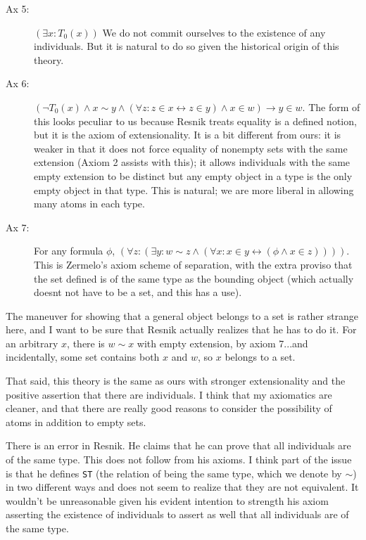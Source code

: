 \documentclass[12pt]{article}
\begin{document}
\begin{description}
\item[Ax 5:]  $(\exists x:T_0(x))$  We do not commit ourselves to the existence of any individuals.  But it is natural to do so given the historical origin of this theory.

\item[Ax 6:]  $(\neg T_0(x) \wedge x \sim y \wedge (\forall z:z \in x \leftrightarrow z \in y) \wedge x \in w) \rightarrow y \in w$.  The form of this looks peculiar to us because Resnik treats equality is a defined notion, but it is the axiom of extensionality.  It is a bit different from ours:  it is weaker in that it does not force equality of nonempty sets with the same extension (Axiom 2 assists with this);  it allows individuals with the same empty extension to be distinct but any empty object in a type is the only empty object in that type.  This is natural;  we are more liberal in allowing many atoms in each type.

\item[Ax 7:] For any formula $\phi$, $(\forall z:(\exists y:w \sim z \wedge (\forall x:x \in y \leftrightarrow (\phi \wedge x \in z))))$.  This is Zermelo's axiom scheme of separation, with the extra proviso that the set defined is of the same type as the bounding object (which actually doesnt not have to be a set, and this has a use).

\end{description}

The maneuver for showing that a general object belongs to a set is rather strange here, and I want to be sure that Resnik actually realizes that he has to do it.
For an arbitrary $x$, there is $w \sim x$ with empty extension, by axiom 7...and incidentally, some set contains both $x$ and $w$, so $x$ belongs to a set.

That said, this theory is the same as ours with stronger extensionality and the positive assertion that there are individuals.  I think that my axiomatics are cleaner, and that there are really good reasons to consider the possibility of atoms in addition to empty sets.

There is an error in Resnik.  He claims that he can prove that all individuals are of the same type.  This does not follow from his axioms.  I think part of the issue is that he defines {\tt ST} (the relation of being the same type, which we denote by $\sim$) in two different ways and does not seem to realize that they are not equivalent.  It wouldn't be unreasonable given his evident intention to strength his axiom asserting the existence of individuals to assert as well that all individuals are of the same type.
\end{document}

